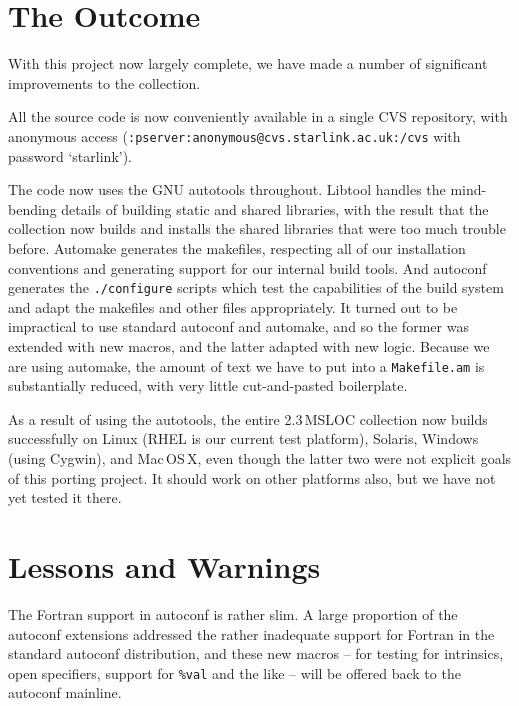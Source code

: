 \documentclass[11pt,twoside]{article}
\begin{document}



\section{The Outcome}
\label{s:result}

With this project now largely complete, we have made a number of
significant improvements to the collection.

All the source code is now conveniently available in a single CVS
repository, with anonymous access
(\texttt{:pserver:anonymous@cvs.starlink.ac.uk:/cvs} with password `starlink').

The code now uses the GNU autotools throughout.  Libtool handles the
mind-bending details of building static and shared libraries, with the
result that the collection now builds and installs the shared
libraries that were too much trouble before.  Automake generates the
makefiles, respecting all of our installation conventions and
generating support for our internal build tools.  And autoconf
generates the \texttt{./configure} scripts which test the capabilities
of the build system and adapt the makefiles and other files
appropriately.  It turned out to be impractical to use standard
autoconf and automake, and so the former was extended with new macros,
and the latter adapted with new logic.  Because we are using automake,
the amount of text we have to put into a \texttt{Makefile.am} is
substantially reduced, with very little cut-and-pasted boilerplate.

As a result of using the autotools, the entire 2.3\,MSLOC collection
now builds successfully on Linux (RHEL is our current test platform), Solaris,
Windows (using Cygwin), and Mac\,OS\,X, even though the latter two
were not explicit goals of this porting project.  It should work on
other platforms also, but we have not yet tested it there.



\section{Lessons and Warnings}
\label{s:lessons}

The Fortran support in autoconf is rather slim.  A large proportion of the
autoconf extensions addressed the rather inadequate support for
Fortran in the standard autoconf distribution, and these new macros -- for
testing for intrinsics, open specifiers, support for \texttt{\%val}
and the like -- will be offered back to the autoconf mainline.
\end{document}
